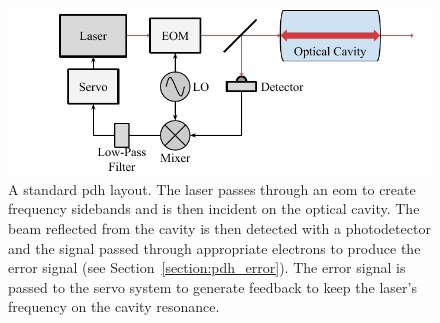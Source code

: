 \begin{figure}
\centering
\includegraphics{part1/Figs/PDH.pdf}
\caption[Pound-Drever-Hall frequency stabilisation setup.]{A standard \gls{pdh} layout.
The laser passes through an \gls{eom} to create frequency sidebands and is then incident on the optical cavity.
The beam reflected from the cavity is then detected with a photodetector and the signal passed through appropriate electrons to produce the error signal (see Section~\ref{section:pdh_error}).
The error signal is passed to the servo system to generate feedback to keep the laser's frequency on the cavity resonance.}
\label{figure:pdh_schematic}
\end{figure}



